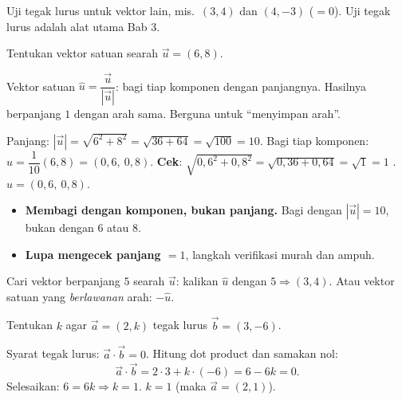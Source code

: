\begin{variasi}
Uji tegak lurus untuk vektor lain, mis.\ $(3,4)$ dan $(4,-3)$
($=0$). Uji tegak lurus adalah alat utama Bab 3.
\end{variasi}

\begin{soalbox}{}
Tentukan vektor satuan searah $\vec u=(6,8)$.
\end{soalbox}

\begin{ingat}{Vektor satuan}
$\hat u=\dfrac{\vec u}{|\vec u|}$: bagi tiap komponen dengan panjangnya.
Hasilnya berpanjang $1$ dengan arah sama. Berguna untuk ``menyimpan arah''.
\end{ingat}

\jawab
{} Panjang: $|\vec u|=\sqrt{6^2+8^2}=\sqrt{36+64}=\sqrt{100}=10$.
 Bagi tiap komponen: $\hat u=\dfrac{1}{10}(6,8)=(0{,}6,\ 0{,}8)$.
 \textbf{Cek}: $\sqrt{0{,}6^2+0{,}8^2}=\sqrt{0{,}36+0{,}64}=\sqrt1=1$
\checkmark.
\jadi $\hat u=(0{,}6,\ 0{,}8)$.

\begin{jebakan}
\begin{itemize}[leftmargin=*,topsep=2pt]
  \item \textbf{Membagi dengan komponen, bukan panjang.} Bagi dengan
  $|\vec u|=10$, bukan dengan $6$ atau $8$.
  \item \textbf{Lupa mengecek panjang $=1$}, langkah verifikasi murah dan ampuh.
\end{itemize}
\end{jebakan}

\begin{variasi}
Cari vektor berpanjang $5$ searah $\vec u$: kalikan $\hat u$ dengan $5\Rightarrow
(3,4)$. Atau vektor satuan yang \emph{berlawanan} arah: $-\hat u$.
\end{variasi}

\begin{soalbox}{}
Tentukan $k$ agar $\vec a=(2,k)$ tegak lurus $\vec b=(3,-6)$.
\end{soalbox}

\jawab
{} Syarat tegak lurus: $\vec a\cdot\vec b=0$.
 Hitung dot product dan samakan nol:
\[
\vec a\cdot\vec b=2\cdot3+k\cdot(-6)=6-6k=0.
\]
 Selesaikan: $6=6k\Rightarrow k=1$.
\jadi $k=1$ (maka $\vec a=(2,1)$).

